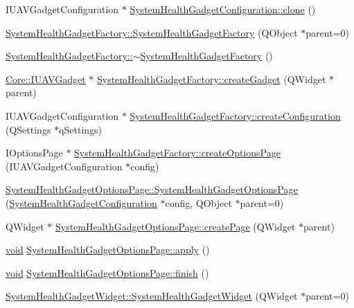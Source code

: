 \begin{DoxyCompactItemize}
\item 
\-I\-U\-A\-V\-Gadget\-Configuration $\ast$ \hyperlink{group___system_health_plugin_gaec4d54c2f539b5bbead55affc7dd496c}{\-System\-Health\-Gadget\-Configuration\-::clone} ()
\item 
\hyperlink{group___system_health_plugin_gaf19ba5915588fac5dd9f368210271115}{\-System\-Health\-Gadget\-Factory\-::\-System\-Health\-Gadget\-Factory} (\-Q\-Object $\ast$parent=0)
\item 
\hyperlink{group___system_health_plugin_ga6d9272ee992e8241b7a4483dce8ff330}{\-System\-Health\-Gadget\-Factory\-::$\sim$\-System\-Health\-Gadget\-Factory} ()
\item 
\hyperlink{class_core_1_1_i_u_a_v_gadget}{\-Core\-::\-I\-U\-A\-V\-Gadget} $\ast$ \hyperlink{group___system_health_plugin_ga042cc7fba53df83dbb7e06626f2b1006}{\-System\-Health\-Gadget\-Factory\-::create\-Gadget} (\-Q\-Widget $\ast$parent)
\item 
\-I\-U\-A\-V\-Gadget\-Configuration $\ast$ \hyperlink{group___system_health_plugin_ga569580fcea35d0f1f9433378dd734624}{\-System\-Health\-Gadget\-Factory\-::create\-Configuration} (\-Q\-Settings $\ast$q\-Settings)
\item 
\-I\-Options\-Page $\ast$ \hyperlink{group___system_health_plugin_gaae1b2e7613b4024f309fd5480fcbe028}{\-System\-Health\-Gadget\-Factory\-::create\-Options\-Page} (\-I\-U\-A\-V\-Gadget\-Configuration $\ast$config)
\item 
\hyperlink{group___system_health_plugin_gaa498d06c1c8158466c564b455b1044dc}{\-System\-Health\-Gadget\-Options\-Page\-::\-System\-Health\-Gadget\-Options\-Page} (\hyperlink{class_system_health_gadget_configuration}{\-System\-Health\-Gadget\-Configuration} $\ast$config, \-Q\-Object $\ast$parent=0)
\item 
\-Q\-Widget $\ast$ \hyperlink{group___system_health_plugin_ga6ac5a910e1fb73f88186c7602a7425b0}{\-System\-Health\-Gadget\-Options\-Page\-::create\-Page} (\-Q\-Widget $\ast$parent)
\item 
\hyperlink{group___u_a_v_objects_plugin_ga444cf2ff3f0ecbe028adce838d373f5c}{void} \hyperlink{group___system_health_plugin_gaff59ee5d1057c119bc98e72b972cdc77}{\-System\-Health\-Gadget\-Options\-Page\-::apply} ()
\item 
\hyperlink{group___u_a_v_objects_plugin_ga444cf2ff3f0ecbe028adce838d373f5c}{void} \hyperlink{group___system_health_plugin_gabcd1e79513ea408e8c9c6ab98baf6d7f}{\-System\-Health\-Gadget\-Options\-Page\-::finish} ()
\item 
\hyperlink{group___system_health_plugin_ga8c9b20860af6995ec8b6970079e00477}{\-System\-Health\-Gadget\-Widget\-::\-System\-Health\-Gadget\-Widget} (\-Q\-Widget $\ast$parent=0)

\end{DoxyCompactItemize}
